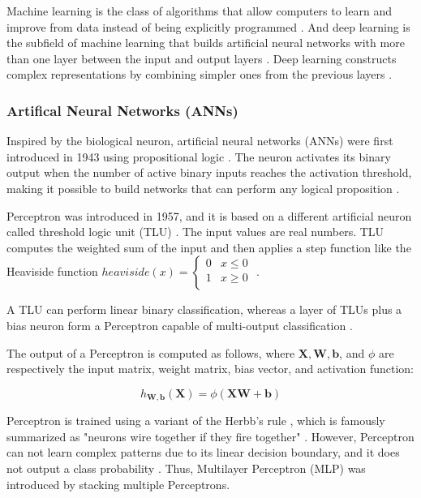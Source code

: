 \documentclass[a4paper, 11pt, oneside]{article}
\begin{document}
Machine learning is the class of algorithms that allow computers to learn and improve from data instead of being
explicitly programmed \cite{samuel1959some, geron2019hands}. And deep learning is the subfield of machine learning that
builds artificial neural networks with more than one layer between the input and output layers
\cite{geron2019hands, burkov2019hundred, zhang2018definition}. Deep learning constructs complex representations by
combining simpler ones from the previous layers \cite{goodfellow2016deep}.

\subsubsection{Artifical Neural Networks (ANNs)}

Inspired by the biological neuron, artificial neural networks (ANNs) were first introduced in 1943 using propositional
logic \cite{mcculloch1943logical}. The neuron activates its binary output when the number of active binary inputs reaches
the activation threshold, making it possible to build networks that can perform any logical proposition
\cite{geron2019hands, mcculloch1943logical}.

Perceptron was introduced in 1957, and it is based on a different artificial neuron called threshold logic unit
(TLU) \cite{rosenblatt1957perceptron}. The input values are real numbers. TLU computes the weighted sum of the input
and then applies a step function like the Heaviside function
$heaviside (x) =
\begin{cases}
  0 & x \le 0 \\
  1 & x \geq 0 \\
\end{cases}$
\cite{geron2019hands, rosenblatt1957perceptron}.

A TLU can perform linear binary classification, whereas a layer of TLUs plus a bias neuron form a Perceptron capable of
multi-output classification \cite{geron2019hands}.

The output of a Perceptron is computed as follows, where $\mathbf{X}, \mathbf{W}, \mathbf{b}$, and $\phi$
are respectively the input matrix, weight matrix, bias vector, and activation function:

$$h_{\mathbf{W,b}}(\mathbf{X}) = \phi(\mathbf{XW} + \mathbf{b})$$

Perceptron is trained using a variant of the Herbb's rule \cite{hebb2005organization}, which is famously summarized
as "neurons wire together if they fire together" \cite{lowel1992selection}. However, Perceptron
can not learn complex patterns due to its linear decision boundary, and it does not output a class probability
\cite{geron2019hands}. Thus, Multilayer Perceptron (MLP) was introduced by stacking multiple Perceptrons.
\end{document}
